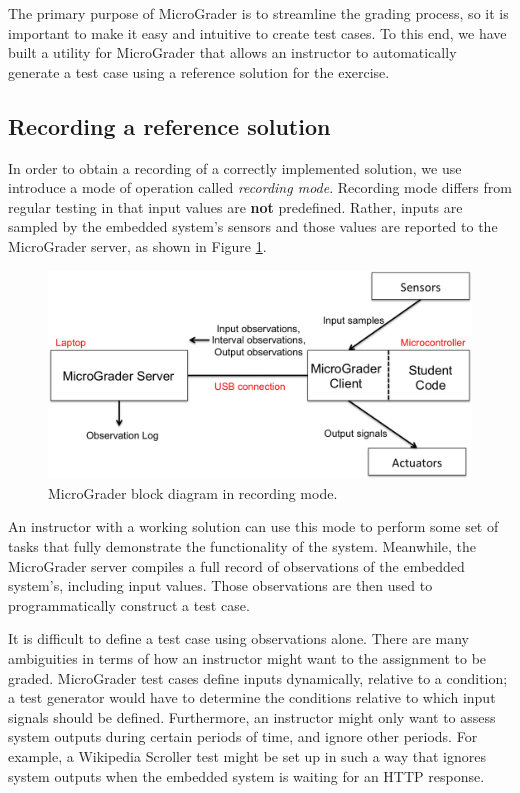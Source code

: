 \documentclass[12pt]{article}
\begin{document}
The primary purpose of MicroGrader is to streamline the grading process, so it is important to make it easy and intuitive to create test cases.  To this end, we have built a utility for MicroGrader that allows an instructor to automatically generate a test case using a reference solution for the exercise.

\subsection{Recording a reference solution}
In order to obtain a recording of a correctly implemented solution, we use introduce a mode of operation called \textit{recording mode}.  Recording mode differs from regular testing in that input values are \textbf{not} predefined.  Rather, inputs are sampled by the embedded system's sensors and those values are reported to the MicroGrader server, as shown in Figure \ref{fig:recording-mode}.

\begin{figure}[ht]
\centering
\includegraphics[width=\linewidth]{recording-mode.png}
\caption{MicroGrader block diagram in recording mode.}
\label{fig:recording-mode}
\end{figure}

An instructor with a working solution can use this mode to perform some set of tasks that fully demonstrate the functionality of the system.  Meanwhile, the MicroGrader server compiles a full record of observations of the embedded system's, including input values.  Those observations are then used to programmatically construct a test case.

It is difficult to define a test case using observations alone.  There are many ambiguities in terms of how an instructor might want to the assignment to be graded.  MicroGrader test cases define inputs dynamically, relative to a condition; a test generator would have to determine the conditions relative to which input signals should be defined.  Furthermore, an instructor might only want to assess system outputs during certain periods of time, and ignore other periods.  For example, a Wikipedia Scroller test might be set up in such a way that ignores system outputs when the embedded system is waiting for an HTTP response.
\end{document}
